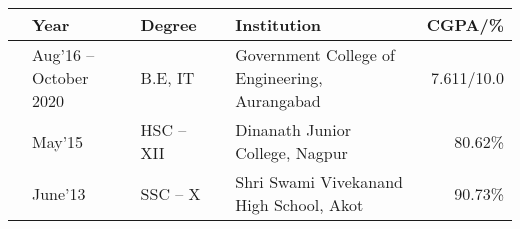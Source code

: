 \vspace{1mm}
\newcommand{\education}[4]{
  & #1 & #2 & & #3 & #4
}
\begin{center}
\begin{tabular}{ | L{0.05cm} l | L{3cm} | L{0.05cm} C{7cm} | r |}
  \hline
  \education{\textbf{Year}}{\textbf{Degree}}{\textbf{Institution}}{\textbf{CGPA/\%}}\\
  \hline
  \education{Aug'16 -- October 2020}{B.E, IT}{Government College of Engineering, Aurangabad}{7.611/10.0}\\
  \education{May'15}{HSC -- XII}{Dinanath Junior College, Nagpur}{80.62\%}\\
  \education{June'13}{SSC -- X}{Shri Swami Vivekanand High School, Akot }{90.73\%}\\
  \hline
\end{tabular}
\end{center}


